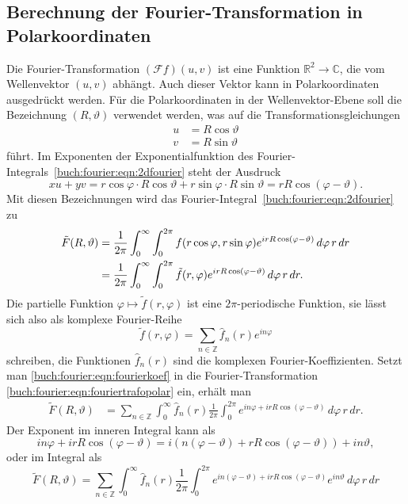 \subsection{Berechnung der Fourier-Transformation in Polarkoordinaten}
Die Fourier-Transformation $(\mathscr{F}f)(u,v)$ ist eine Funktion
$\mathbb{R}^2\to\mathbb{C}$, die vom Wellenvektor $(u,v)$ abhängt.
Auch dieser Vektor kann in Polarkoordinaten ausgedrückt werden.
Für die Polarkoordinaten in der Wellenvektor-Ebene soll die Bezeichnung
$(R,\vartheta)$ verwendet werden, was auf die Transformationsgleichungen
\begin{align*}
u&=R\cos\vartheta\\
v&=R\sin\vartheta
\end{align*}
führt.
Im Exponenten der Exponentialfunktion
des Fourier-Integrals~\eqref{buch:fourier:eqn:2dfourier}
steht der Ausdruck
\[
xu+yv
=
r\cos\varphi\cdot R\cos\vartheta
+
r\sin\varphi\cdot R\sin\vartheta
=
rR\cos(\varphi-\vartheta).
\]
Mit diesen Bezeichnungen wird das
Fourier-Integral~\eqref{buch:fourier:eqn:2dfourier}
zu
\begin{align}
\tilde{F}(R,\vartheta)
&=
\frac{1}{2\pi}
\int_{0}^{\infty}
\int_{0}^{2\pi}
f(r\cos\varphi,r\sin\varphi)
e^{irR\cos(\varphi-\vartheta)}
\,d\varphi\,r\, dr
\notag
\\
&=
\frac{1}{2\pi}
\int_{0}^{\infty}
\int_{0}^{2\pi}
\tilde{f}(r,\varphi)
e^{irR\cos(\varphi-\vartheta)}
\,d\varphi\,r\, dr.
\label{buch:fourier:eqn:fouriertrafopolar}
\end{align}
Die partielle Funktion $\varphi\mapsto \tilde{f}(r,\varphi)$
ist eine $2\pi$-periodische Funktion, sie lässt sich also als
komplexe Fourier-Reihe
\begin{equation}
\tilde{f}(r,\varphi)
=
\sum_{n\in\mathbb{Z}} \hat{f}_n(r) e^{in\varphi}
\label{buch:fourier:eqn:fourierkoef}
\end{equation}
schreiben, die Funktionen $\hat{f}_n(r)$ sind die komplexen
Fourier-Koeffizienten.
Setzt man \eqref{buch:fourier:eqn:fourierkoef} in die Fourier-Transformation
\eqref{buch:fourier:eqn:fouriertrafopolar} ein, erhält man
\begin{align*}
\tilde{F}(R,\vartheta)
&=
\sum_{n\in\mathbb{Z}}
\int_0^\infty
\hat{f}_n(r)
\frac{1}{2\pi}
\int_0^{2\pi}
e^{in\varphi+irR\cos(\varphi-\vartheta)}
\,d\varphi
\,
r\,dr.
\end{align*}
Der Exponent im inneren Integral kann als
\[
in\varphi+irR\cos(\varphi-\vartheta)
=
i(n(\varphi-\vartheta)+rR\cos(\varphi-\vartheta))
+
in\vartheta,
\]
oder im Integral als
\[
\tilde{F}(R,\vartheta)
=
\sum_{n\in\mathbb{Z}}
\int_0^\infty
\hat{f}_n(r)
\frac{1}{2\pi}
\int_0^{2\pi}
e^{in(\varphi-\vartheta)+irR\cos(\varphi-\vartheta)}
e^{in\vartheta}
\,d\varphi
\,
r\,dr
\]

